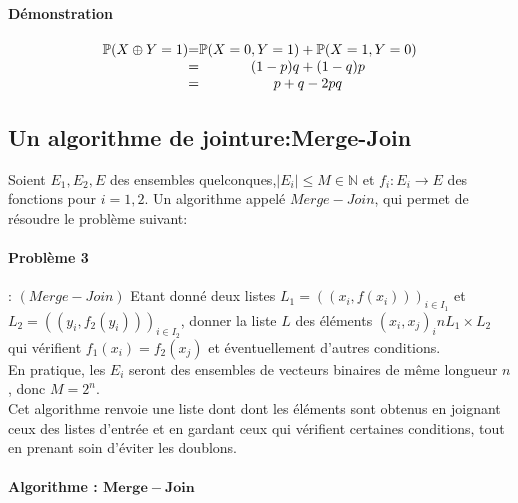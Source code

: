 \documentclass[12pt,openany]{report}
\begin{document}
\paragraph{Démonstration\\}
\begin{center}
\[
\left.
\begin{array}{c @{=} c}
    \mathbb{P}(X \oplus Y=1) &\mathbb{P}(X=0,Y=1)+\mathbb{P}(X=1,Y=0)  \\
& (1-p)q+(1-q)p\\
& p+q-2pq
\end{array}
\right.
\]

\end{center}





\subsection{Un algorithme de jointure:Merge-Join}

Soient $E_1,E_2,E$ des ensembles quelconques,$\mid E_i \mid\leq M \in \mathbb{N}   $ et $f_i:E_i \rightarrow E   $ des fonctions pour $ i=1,2 $. Un algorithme appelé $ Merge-Join $, qui permet de résoudre le problème suivant:
\paragraph{Problème 3}: $(Merge- Join) $ Etant donné deux listes $  L_1=((x_i,f(x_i)))_{i \in I_1}$ et $L_2=((y_i,f_2(y_i)))_{i \in I_2} $, donner la liste $L $ des éléments $(x_i,x_j)_in L_1 \times L_2  $ qui vérifient $f_1(x_i)=f_2(x_j) $ et éventuellement d'autres conditions.\\
En pratique, les $E_i $ seront des ensembles de vecteurs binaires de même longueur $n$, donc $M=2^n  $. \\
Cet algorithme renvoie une liste dont dont les éléments sont obtenus en joignant
ceux des listes d’entrée et en gardant ceux qui vérifient certaines conditions,
tout en prenant soin d’éviter les doublons.
\paragraph{Algorithme : $  \mathbf{Merge-Join} $ }
\end{document}
